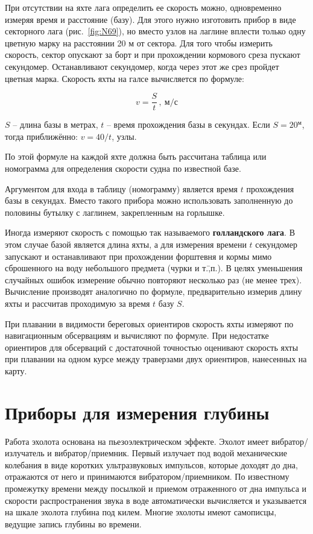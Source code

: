 \documentclass[a4paper, 12pt, twoside, final, book, russian, fittopage, cyremdash]{ncc}
\newcommand{\ris}[1]{\ref{fig:#1}}
\newcommand{\tmin}{\ensuremath{^\text{м}}\xspace}
\begin{document}
При отсутствии на яхте лага определить ее скорость можно, одновременно измеряя время и расстояние (базу). Для этого нужно изготовить прибор в виде секторного лага (рис.~\ris{N69}), но вместо узлов на лаглине вплести только одну цветную марку на расстоянии 20 м от сектора. Для того чтобы измерить скорость, сектор опускают за борт и при прохождении кормового среза пускают секундомер. Останавливают секундомер, когда через этот же срез пройдет цветная марка. Скорость яхты на галсе вычисляется по формуле: 

\begin{equation}
  v = \frac{S}{t}\, ,\  \text{м/с}
\end{equation}

$S$ \--- длина базы в метрах, $t$ \--- время прохождения базы в секундах. Если $S = 20$\tmin, тогда приближённо: $v = 40 / t$, узлы.

По этой формуле на каждой яхте должна быть рассчитана таблица или номограмма для определения скорости судна по известной базе. 

Аргументом для входа в таблицу (номограмму) является время $t$ прохождения базы в секундах. Вместо такого прибора можно использовать заполненную до половины бутылку с лаглинем, закрепленным на горлышке. 

Иногда измеряют скорость с помощью так называемого \textbf{голландского лага}. В этом случае базой является длина яхты, а для измерения времени $t$ секундомер запускают и останавливают при прохождении форштевня и кормы мимо сброшенного на воду небольшого предмета (чурки и т.\=,п.). В целях уменьшения случайных ошибок измерение обычно повторяют несколько раз (не менее трех). Вычисление производят аналогично по формуле, предварительно измерив длину яхты и рассчитав проходимую за время $t$ базу $S$. 

При плавании в видимости береговых ориентиров скорость яхты измеряют по навигационным обсервациям и вычисляют по формуле. При недостатке ориентиров для обсерваций с достаточной точностью оценивают скорость яхты при плавании на одном курсе между траверзами двух ориентиров, нанесенных на карту. 

\section{Приборы для измерения глубины}

Работа эхолота основана на пьезоэлектрическом эффекте. Эхолот имеет вибратор\-/излучатель и вибратор\-/приемник. Первый излучает под водой механические колебания в виде коротких ультразвуковых импульсов, которые доходят до дна, отражаются от него и принимаются вибратором\-/приемником. По известному промежутку времени между посылкой и приемом отраженного от дна импульса и скорости распространения звука в воде автоматически вычисляется и указывается на шкале эхолота глубина под килем. Многие эхолоты имеют самописцы, ведущие запись глубины во времени. 
\end{document}
